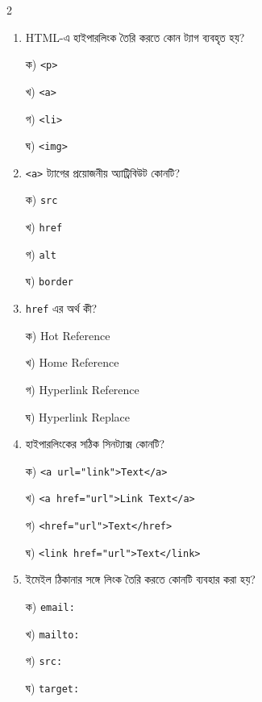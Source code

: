 \begin{multicols}{2}
\begin{enumerate}[leftmargin=*,itemsep=5pt]
\item \begin{minipage}[t]{\linewidth}\vspace{0pt}
HTML-এ হাইপারলিংক তৈরি করতে কোন ট্যাগ ব্যবহৃত হয়?
\par ক) \texttt{<p>}
\par খ) \texttt{<a>}
\par গ) \texttt{<li>}
\par ঘ) \texttt{<img>}
\end{minipage}

\item \begin{minipage}[t]{\linewidth}\vspace{0pt}
\texttt{<a>} ট্যাগের প্রয়োজনীয় অ্যাট্রিবিউট কোনটি?
\par ক) \texttt{src}
\par খ) \texttt{href}
\par গ) \texttt{alt}
\par ঘ) \texttt{border}
\end{minipage}

\item \begin{minipage}[t]{\linewidth}\vspace{0pt}
\texttt{href} এর অর্থ কী?
\par ক) Hot Reference
\par খ) Home Reference
\par গ) Hyperlink Reference
\par ঘ) Hyperlink Replace
\end{minipage}

\item \begin{minipage}[t]{\linewidth}\vspace{0pt}
হাইপারলিংকের সঠিক সিনট্যাক্স কোনটি?
\par ক) \texttt{<a url="link">Text</a>}
\par খ) \texttt{<a href="url">Link Text</a>}
\par গ) \texttt{<href="url">Text</href>}
\par ঘ) \texttt{<link href="url">Text</link>}
\end{minipage}

\item \begin{minipage}[t]{\linewidth}\vspace{0pt}
ইমেইল ঠিকানার সঙ্গে লিংক তৈরি করতে কোনটি ব্যবহার করা হয়?
\par ক) \texttt{email:}
\par খ) \texttt{mailto:}
\par গ) \texttt{src:}
\par ঘ) \texttt{target:}
\end{minipage}


\end{enumerate}
\end{multicols}
